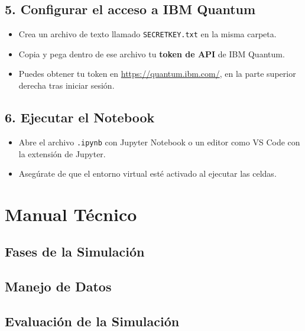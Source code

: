 \documentclass{article}
\begin{document}
\subsection*{5. Configurar el acceso a IBM Quantum}

\begin{itemize}
    \item Crea un archivo de texto llamado \texttt{SECRETKEY.txt} en la misma carpeta.
    \item Copia y pega dentro de ese archivo tu \textbf{token de API} de IBM Quantum.
    \item Puedes obtener tu token en \url{https://quantum.ibm.com/}, en la parte superior 
          derecha tras iniciar sesión.
\end{itemize}

\subsection*{6. Ejecutar el Notebook}

\begin{itemize}
    \item Abre el archivo \texttt{.ipynb} con Jupyter Notebook o un editor como VS Code con 
          la extensión de Jupyter.
    \item Asegúrate de que el entorno virtual esté activado al ejecutar las celdas.
\end{itemize}




\section{Manual Técnico}\label{sec:man_t}


\subsection{Fases de la Simulación}


\subsection{Manejo de Datos}

\subsection{Evaluación de la Simulación}
\end{document}

